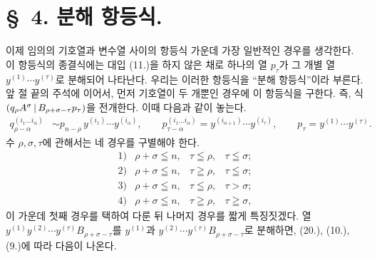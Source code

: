 \section*{\S\ 4. 분해 항등식.}
이제 임의의 기호열과 변수열 사이의 항등식 가운데 가장 일반적인 경우를 생각한다. 이 항등식의 종결식에는 대입 (11.)을 하지 않은 채로 하나의 열 $p_\tau$가 그 개별 열 $y^{(1)}\cdots y^{(\tau)}$로 분해되어 나타난다. 우리는 이러한 항등식을 ``분해 항등식''이라 부른다. 앞 절 끝의 주석에 이어서, 먼저 기호열이 두 개뿐인 경우에 이 항등식을 구한다. 즉, 식 $(q_\rho A^\sigma\,|\,B_{\rho+\sigma-\tau}p_\tau)$을 전개한다. 이때 다음과 같이 놓는다.
\begin{equation}
\begin{aligned}
q_{\rho-\alpha}^{(i_1\ldots i_\alpha)}&\sim p_{n-\rho}\,y^{(i_1)}\cdots y^{(i_\alpha)},\qquad
p_{\tau-\alpha}^{(i_1\ldots i_\alpha)}=y^{(i_{\alpha+1})}\cdots y^{(i_\tau)},\qquad
p_\tau=y^{(1)}\cdots y^{(\tau)}.
\end{aligned}
\tag{22}
\end{equation}
수 $\rho,\sigma,\tau$에 관해서는 네 경우를 구별해야 한다.
\[
\begin{array}{llll}
1)&\rho+\sigma\leqq n,& \tau\leqq\rho,& \tau\leqq\sigma;\\[2pt]
2)&\rho+\sigma\leqq n,& \tau\geqq\rho,& \tau\leqq\sigma;\\[2pt]
3)&\rho+\sigma\leqq n,& \tau\leqq\rho,& \tau>\sigma;\\[2pt]
4)&\rho+\sigma\leqq n,& \tau\geqq\rho,& \tau\geqq\sigma,
\end{array}
\]
이 가운데 첫째 경우를 택하여 다룬 뒤 나머지 경우를 짧게 특징짓겠다. 열 $y^{(1)}y^{(2)}\cdots y^{(\tau)}B_{\rho+\sigma-\tau}$를 $y^{(1)}$과 $y^{(2)}\cdots y^{(\tau)}B_{\rho+\sigma-\tau}$로 분해하면, (20.), (10.), (9.)에 따라 다음이 나온다.


